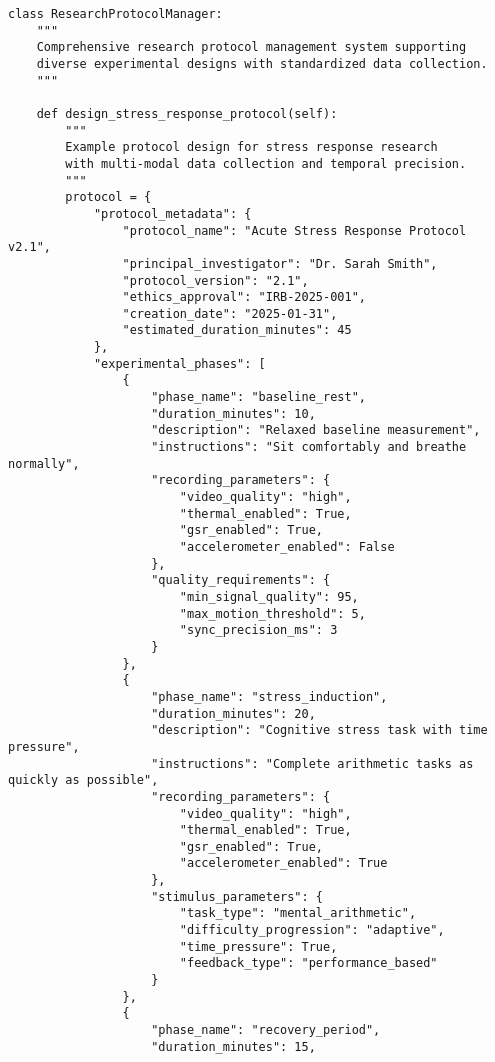\documentclass[11pt,a4paper]{article}
\begin{document}
\begin{verbatim}
class ResearchProtocolManager:
    """
    Comprehensive research protocol management system supporting
    diverse experimental designs with standardized data collection.
    """

    def design_stress_response_protocol(self):
        """
        Example protocol design for stress response research
        with multi-modal data collection and temporal precision.
        """
        protocol = {
            "protocol_metadata": {
                "protocol_name": "Acute Stress Response Protocol v2.1",
                "principal_investigator": "Dr. Sarah Smith",
                "protocol_version": "2.1",
                "ethics_approval": "IRB-2025-001",
                "creation_date": "2025-01-31",
                "estimated_duration_minutes": 45
            },
            "experimental_phases": [
                {
                    "phase_name": "baseline_rest",
                    "duration_minutes": 10,
                    "description": "Relaxed baseline measurement",
                    "instructions": "Sit comfortably and breathe normally",
                    "recording_parameters": {
                        "video_quality": "high",
                        "thermal_enabled": True,
                        "gsr_enabled": True,
                        "accelerometer_enabled": False
                    },
                    "quality_requirements": {
                        "min_signal_quality": 95,
                        "max_motion_threshold": 5,
                        "sync_precision_ms": 3
                    }
                },
                {
                    "phase_name": "stress_induction",
                    "duration_minutes": 20,
                    "description": "Cognitive stress task with time pressure",
                    "instructions": "Complete arithmetic tasks as quickly as possible",
                    "recording_parameters": {
                        "video_quality": "high",
                        "thermal_enabled": True,
                        "gsr_enabled": True,
                        "accelerometer_enabled": True
                    },
                    "stimulus_parameters": {
                        "task_type": "mental_arithmetic",
                        "difficulty_progression": "adaptive",
                        "time_pressure": True,
                        "feedback_type": "performance_based"
                    }
                },
                {
                    "phase_name": "recovery_period",
                    "duration_minutes": 15,

\end{verbatim}
\end{document}

